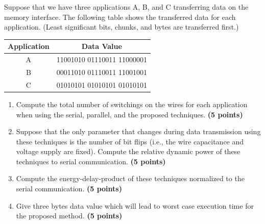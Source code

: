 \documentclass[a4paper, 15pt]{exam}
\begin{document}
\begin{enumerate}
Suppose that we have three applications A, B, and C transferring data on the memory interface. The following table shows the transferred data for each application.
(Least significant bits, chunks, and bytes are transferred first.)
\begin{center}
\begin{tabular}{ |c|c|} 
 \hline
  
  Application &Data Value\\ 
  \hline
 A&11001010 01110011 11000001\\ 
 \hline
 B&
00011010 01110011 11001001
\\ 
 \hline
 C&
01010101 01010101 01010101
\\ 
 \hline
\end{tabular}
\end{center}
\begin{enumerate}
\item Compute the total number of switchings on the wires for each application when using the serial, parallel, and the proposed techniques.
\textbf{(5 points)}
\item Suppose that the only parameter that changes during data transmission using these techniques is the number of bit flips (i.e., the wire capacitance and voltage supply are fixed). Compute the relative dynamic power of these techniques to serial communication.
\textbf {(5 points)}
\item Compute the energy-delay-product of these techniques normalized to the serial communication.
\textbf{(5 points)}
\item  Give three bytes data value which will lead to worst case execution time for the proposed method. 
\textbf{(5 points)}
%

\end{enumerate}
\end{enumerate}
\end{document}
